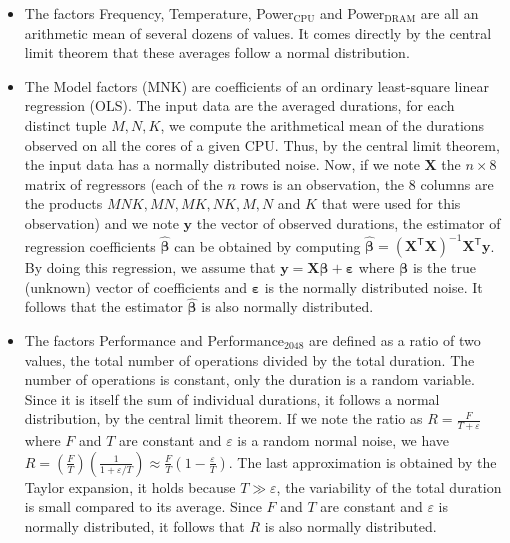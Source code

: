             \begin{itemize}
                \item The factors Frequency, Temperature, Power$_{\text{CPU}}$ and Power$_{\text{DRAM}}$ are all an
                    arithmetic mean of several dozens of values. It comes directly by the central limit theorem that
                    these averages follow a normal distribution.
                \item The Model factors (\eg MNK) are coefficients of an ordinary least-square linear regression (OLS).
                    The input data are the averaged \dgemm durations, for each distinct tuple \(M,N,K\), we compute the
                    arithmetical mean of the durations observed on all the cores of a given CPU. Thus, by the central
                    limit theorem, the input data has a normally distributed noise. Now, if we note \(\bm{X}\) the
                    \(n\times8\) matrix of regressors (each of the \(n\) rows is an observation, the 8 columns are the
                    products \(MNK, MN, MK, NK, M, N\) and \(K\) that were used for this observation) and we note
                    \(\bm{y}\) the vector of observed durations, the estimator of regression coefficients
                    \(\hat{\bm{\beta}}\) can be obtained by computing \(\hat{\bm{\beta}} = \left( \bm{X}^{\mathsf T}
                    \bm{X} \right)^{-1} \bm{X}^{\mathsf T} \bm{y} \).  By doing this regression, we assume that \(\bm{y}
                    = \bm{X}\bm{\beta} + \bm{\varepsilon}\) where \(\bm{\beta}\) is the true (unknown) vector of coefficients
                    and \(\bm{\varepsilon}\) is the normally distributed noise. It follows that the estimator
                    \(\hat{\bm{\beta}}\) is also normally distributed.
                \item The factors Performance and Performance\(_{2048}\) are defined as a ratio of two values, the total
                    number of operations divided by the total duration. The number of operations is constant, only the
                    duration is a random variable. Since it is itself the sum of individual durations, it follows a
                    normal distribution, by the central limit theorem. If we note the ratio as
                    \(R=\frac{F}{T+\varepsilon}\) where \(F\) and \(T\) are constant and \(\varepsilon\) is a random
                    normal noise, we have \(R = \left(\frac{F}{T}\right) \left(\frac{1}{1+\varepsilon/T}\right)
                    \approx \frac{F}{T}\left(1-\frac{\varepsilon}{T}\right)\). The last approximation is obtained by the
                    Taylor expansion, it holds because \(T \gg \varepsilon\), \ie the variability of the total duration
                    is small compared to its average. Since \(F\) and \(T\) are constant and \(\varepsilon\) is normally
                    distributed, it follows that \(R\) is also normally distributed.
            \end{itemize}

